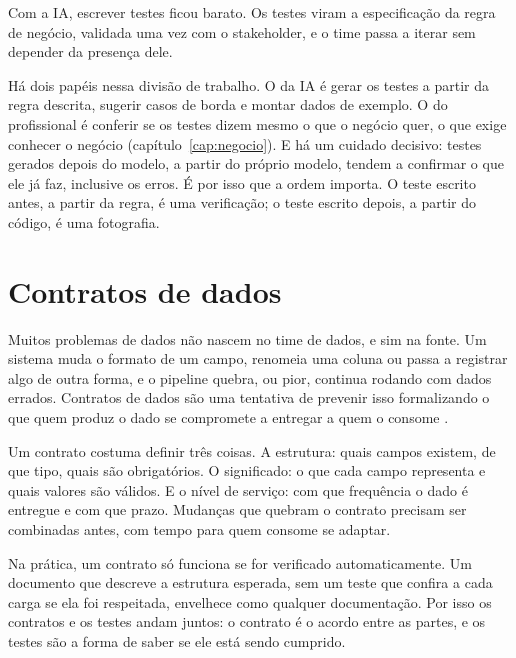 \begin{destaque}
Com a IA, escrever testes ficou barato. Os testes viram a especificação da regra de negócio,
validada uma vez com o stakeholder, e o time passa a iterar sem depender da presença dele.
\end{destaque}

Há dois papéis nessa divisão de trabalho. O da IA é gerar os testes a partir da regra
descrita, sugerir casos de borda e montar dados de exemplo. O do profissional é conferir se
os testes dizem mesmo o que o negócio quer, o que exige conhecer o negócio
(capítulo~\ref{cap:negocio}). E há um cuidado decisivo: testes gerados depois do modelo, a
partir do próprio modelo, tendem a confirmar o que ele já faz, inclusive os erros. É por isso
que a ordem importa. O teste escrito antes, a partir da regra, é uma verificação; o teste
escrito depois, a partir do código, é uma fotografia.


\section{Contratos de dados}
\label{sec:contratos}

Muitos problemas de dados não nascem no time de dados, e sim na fonte. Um sistema muda o
formato de um campo, renomeia uma coluna ou passa a registrar algo de outra forma, e o
pipeline quebra, ou pior, continua rodando com dados errados. Contratos de dados são uma
tentativa de prevenir isso formalizando o que quem produz o dado se compromete a entregar a
quem o consome \parencite{jones2023}.

Um contrato costuma definir três coisas. A estrutura: quais campos existem, de que tipo, quais
são obrigatórios. O significado: o que cada campo representa e quais valores são válidos. E o
nível de serviço: com que frequência o dado é entregue e com que prazo. Mudanças que quebram o
contrato precisam ser combinadas antes, com tempo para quem consome se adaptar.

Na prática, um contrato só funciona se for verificado automaticamente. Um documento que
descreve a estrutura esperada, sem um teste que confira a cada carga se ela foi respeitada,
envelhece como qualquer documentação. Por isso os contratos e os testes andam juntos: o
contrato é o acordo entre as partes, e os testes são a forma de saber se ele está sendo
cumprido.

